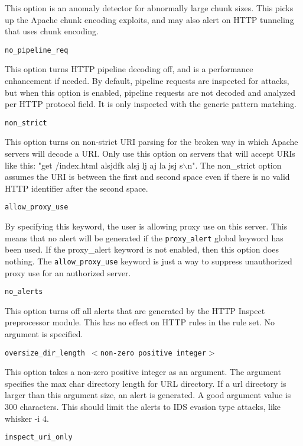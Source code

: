 \documentclass[english]{report}
\newcounter{slistnum}
\newenvironment{slist}
{ \begin{list}{ {\bf \arabic{slistnum}.} }{\usecounter{slistnum} } }
{ \end{list} }
\begin{document}
\begin{slist}
This option is an anomaly detector for abnormally large chunk sizes.  This
picks up the Apache chunk encoding exploits, and may also alert on HTTP
tunneling that uses chunk encoding.

\item \texttt{no\_pipeline\_req}

This option turns HTTP pipeline decoding off, and is a performance enhancement
if needed.  By default, pipeline requests are inspected for attacks, but when
this option is enabled, pipeline requests are not decoded and analyzed per
HTTP protocol field.  It is only inspected with the generic pattern
matching.

\item \texttt{non\_strict}

This option turns on non-strict URI parsing for the broken way in which Apache
servers will decode a URI.  Only use this option on servers that will accept
URIs like this: "get /index.html alsjdfk alsj lj aj  la jsj s$\backslash$n".  The
non\_strict option assumes the URI is between the first and second space even if
there is no valid HTTP identifier after the second space.

\item \texttt{allow\_proxy\_use}

By specifying this keyword, the user is allowing proxy use on this server.
This means that no alert will be generated if the \texttt{proxy\_alert} global keyword
has been used.  If the proxy\_alert keyword is not enabled, then this option
does nothing.  The \texttt{allow\_proxy\_use} keyword is just a way to suppress
unauthorized proxy use for an authorized server.  

\item \texttt{no\_alerts}

This option turns off all alerts that are generated by the HTTP Inspect
preprocessor module.  This has no effect on HTTP rules in the rule set.  No
argument is specified.

\item \texttt{oversize\_dir\_length $<$non-zero positive integer$>$}

This option takes a non-zero positive integer as an argument.  The argument
specifies the max char directory length for URL directory.  If a url directory
is larger than this argument size, an alert is generated. A good argument
value is 300 characters.  This should limit the alerts to IDS evasion type attacks,
like whisker -i 4.

\item \texttt{inspect\_uri\_only}


\end{slist}
\end{document}
